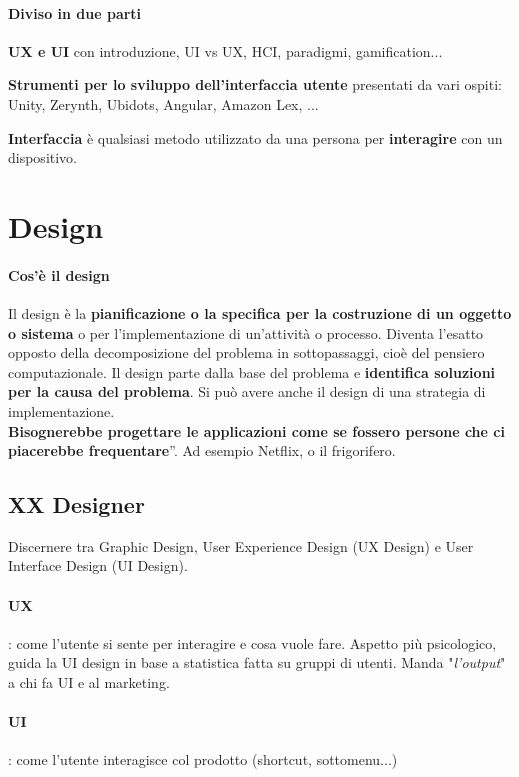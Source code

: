 \documentclass[10pt]{article}
\begin{document}
\paragraph{Diviso in due parti}
\begin{list}{-}{}
\item \textbf{UX e UI} con introduzione, UI vs UX, HCI, paradigmi, gamification...
\item \textbf{Strumenti per lo sviluppo dell'interfaccia utente} presentati da vari ospiti: Unity, Zerynth, Ubidots, Angular, Amazon Lex, ...
\end{list}

\textbf{Interfaccia} è qualsiasi metodo utilizzato da una persona per \textbf{interagire} con un dispositivo.

\section{Design}
\paragraph{Cos'è il design} Il design è la \textbf{pianificazione o la specifica per la costruzione di un oggetto o sistema} o per l'implementazione di un'attività o processo. Diventa l'esatto opposto della decomposizione del problema in sottopassaggi, cioè del pensiero computazionale. Il design parte dalla base del problema e \textbf{identifica soluzioni per la causa del problema}. Si può avere anche il design di una strategia di implementazione.\\
\quotedblbase \textbf{Bisognerebbe progettare le applicazioni come se fossero persone che ci piacerebbe frequentare}\textquotedblright. Ad esempio Netflix, o il frigorifero.

\subsection{XX Designer}
Discernere tra Graphic Design, User Experience Design (UX Design) e User Interface Design (UI Design).
\paragraph{UX}: come l'utente si sente per interagire e cosa vuole fare. Aspetto più psicologico, guida la UI design in base a statistica fatta su gruppi di utenti. Manda "\textit{l'output}" a chi fa UI e al marketing.\\
\paragraph{UI}: come l'utente interagisce col prodotto (shortcut, sottomenu...)\\
\end{document}
